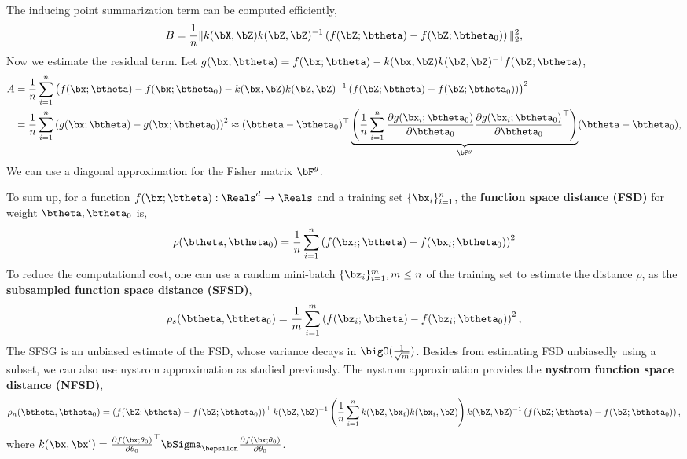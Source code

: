 The inducing point summarization term can be computed efficiently,
\begin{align}
    B = \frac{1}{n}\|k(\bX, \bZ) k(\bZ, \bZ)^{-1} \left( f(\bZ; \btheta) - f(\bZ; \btheta_0) \right)\|_2^2,
\end{align}
Now we estimate the residual term. Let $g(\bx; \btheta) = f(\bx; \btheta)-k(\bx, \bZ)k(\bZ, \bZ)^{-1}f(\bZ; \btheta) $,
\begin{align}
A 
&= \frac{1}{n}\sum_{i=1}^n \left(f(\bx; \btheta) - f(\bx; \btheta_0) - k(\bx, \bZ)k(\bZ, \bZ)^{-1} \left( f(\bZ; \btheta) - f(\bZ; \btheta_0) \right)\right)^2 \\
& = \frac{1}{n}\sum_{i=1}^n \left(g(\bx; \btheta) - g(\bx; \btheta_0)\right)^2\approx (\btheta - \btheta_0)^{\top} \underbrace{\left(\frac{1}{n}\sum_{i=1}^n \frac{\partial g(\bx_i; \btheta_0) }{\partial \btheta_0}\frac{\partial g(\bx_i; \btheta_0)}{\partial \btheta_0}^{\top}  \right)}_{\bF^g} (\btheta - \btheta_0),
\end{align}
We can use a diagonal approximation for the Fisher matrix $\bF^g$.

To sum up, for a function $f(\bx; \btheta): \Reals^d \to \Reals$ and a training set $\{\bx_i\}_{i=1}^n$, the \textbf{function space distance (FSD)} for weight $\btheta, \btheta_0$ is,
\begin{align}
    \rho(\btheta, \btheta_0) = \frac{1}{n}\sum_{i=1}^n \left(f(\bx_i; \btheta) - f(\bx_i; \btheta_0) \right)^2
\end{align}
To reduce the computational cost, one can use a random mini-batch $\{\bz_i\}_{i=1}^m, m\leq n$ of the training set to estimate the distance $\rho$, as the \textbf{subsampled function space distance (SFSD)},
\begin{align}
    \rho_s(\btheta, \btheta_0) = \frac{1}{m}\sum_{i=1}^m \left(f(\bz_i; \btheta) - f(\bz_i; \btheta_0) \right)^2,
\end{align}
The SFSG is an unbiased estimate of the FSD, whose variance decays in $\bigO(\frac{1}{\sqrt{m}})$. Besides from estimating FSD unbiasedly using a subset, we can also use nystrom approximation as studied previously. The nystrom approximation provides the \textbf{nystrom function space distance (NFSD)},
\begin{align}
    \rho_n(\btheta, \btheta_0) = \left( f(\bZ; \btheta) - f(\bZ; \btheta_0) \right)^{\top}k(\bZ, \bZ)^{-1}   \left(\frac{1}{n}\sum_{i=1}^n k(\bZ, \bx_i)k(\bx_i, \bZ)\right) k(\bZ, \bZ)^{-1} \left( f(\bZ; \btheta) - f(\bZ; \btheta_0) \right), \notag 
\end{align}
where $k(\bx, \bx') = \frac{\partial f(\bx; \theta_0)}{\partial \theta_0}^{\top} \bSigma_{\bepsilon} \frac{\partial f(\bx; \theta_0)}{\partial \theta_0}$.


